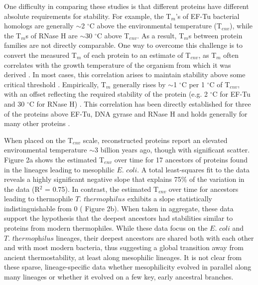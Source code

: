 One difficulty in comparing these studies is that different proteins
have different absolute requirements for stability. For example, the
T$_{m}$'s of EF-Tu bacterial homologs are generally $\sim$2 $^{\circ}$C
above the environmental temperature (T$_{env}$), while the T$_{m}$s
of RNase H are $\sim$30 $^{\circ}$C above T$_{env}$. As a result,
T$_{m}$s between protein families are not directly comparable. One
way to overcome this challenge is to convert the measured T$_{m}$
of each protein to an estimate of T$_{env}$, as T$_{m}$ often correlates
with the growth temperature of the organism from which it was derived
\cite{gromiha_important_1999}. In most cases, this correlation arises
to maintain stability above some critical threshold \cite{taverna_why_2002}.
Empirically, T$_{m}$ generally rises by $\sim$1 $^{\circ}$C per
1 $^{\circ}$C of T$_{env}$, with an offset reflecting the required
stability of the protein (e.g. 2 $^{\circ}$C for EF-Tu and 30 $^{\circ}$C
for RNase H) \cite{gromiha_important_1999}. This correlation has
been directly established for three of the proteins above \textemdash{}
EF-Tu, DNA gyrase and RNase H \cite{gaucher_palaeotemperature_2008,akanuma_experimental_2013,hart_thermodynamic_2014}
\textemdash{} and holds generally for many other proteins \cite{gromiha_important_1999}.

When placed on the T$_{env}$ scale, reconstructed proteins report
an elevated environmental temperature $\sim$3 billion years ago,
though with significant scatter. Figure 2a shows the estimated T$_{env}$
over time for 17 ancestors of proteins found in the lineages leading
to mesophilic $\textit{E. coli}$. A total least-squares fit to the
data reveals a highly significant negative slope that explains 75\%
of the variation in the data (R$^{2}$ = 0.75). In contrast, the estimated
T$_{env}$ over time for ancestors leading to thermophile $\textit{T. thermophilus}$
exhibits a slope statistically indistinguishable from 0 ( Figure 2b).
When taken in aggregate, these data support the hypothesis that the
deepest ancestors had stabilities similar to proteins from modern
thermophiles. While these data focus on the $\textit{E. coli}$ and
$\textit{T. thermophilus}$ lineages, their deepest ancestors are
shared both with each other and with most modern bacteria, thus suggesting
a global transition away from ancient thermostability, at least along
mesophilic lineages. It is not clear from these sparse, lineage-specific
data whether mesophilicity evolved in parallel along many lineages
or whether it evolved on a few key, early ancestral branches.

